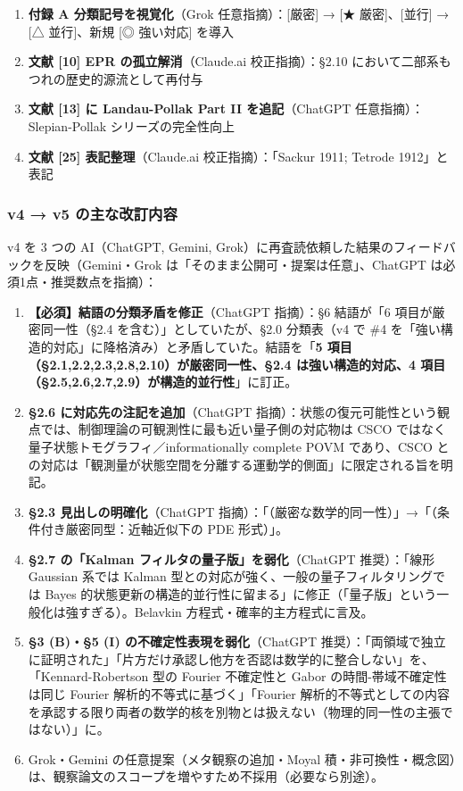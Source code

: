 \documentclass[
]{ltjsarticle}
\providecommand{\tightlist}{%
  \setlength{\itemsep}{0pt}\setlength{\parskip}{0pt}}
\begin{document}
\begin{enumerate}
  に「非ユニタリ Jones 行列は対応外」、\#9 に「量子側 Lindblad
  形式」など
\item
  \textbf{付録 A 分類記号を視覚化}（Grok 任意指摘）：{[}厳密{]} → {[}★
  厳密{]}、{[}並行{]} → {[}△ 並行{]}、新規 {[}◎ 強い対応{]} を導入
\item
  \textbf{文献 {[}10{]} EPR の孤立解消}（Claude.ai 校正指摘）：§2.10
  において二部系もつれの歴史的源流として再付与
\item
  \textbf{文献 {[}13{]} に Landau-Pollak Part II を追記}（ChatGPT
  任意指摘）：Slepian-Pollak シリーズの完全性向上
\item
  \textbf{文献 {[}25{]} 表記整理}（Claude.ai 校正指摘）：「Sackur 1911;
  Tetrode 1912」と表記
\end{enumerate}

\subsubsection{v4 → v5
の主な改訂内容}\label{v4-v5-ux306eux4e3bux306aux6539ux8a02ux5185ux5bb9}

v4 を 3 つの AI（ChatGPT, Gemini,
Grok）に再査読依頼した結果のフィードバックを反映（Gemini・Grok
は「そのまま公開可・提案は任意」、ChatGPT は必須1点・推奨数点を指摘）：

\begin{enumerate}
\def\labelenumi{\arabic{enumi}.}
\tightlist
\item
  \textbf{【必須】結語の分類矛盾を修正}（ChatGPT 指摘）：§6 結語が「6
  項目が厳密同一性（§2.4 を含む）」としていたが、§2.0 分類表（v4 で \#4
  を「強い構造的対応」に降格済み）と矛盾していた。結語を「\textbf{5
  項目（§2.1,2.2,2.3,2.8,2.10）が厳密同一性、§2.4 は強い構造的対応、4
  項目（§2.5,2.6,2.7,2.9）が構造的並行性}」に訂正。
\item
  \textbf{§2.6 に対応先の注記を追加}（ChatGPT
  指摘）：状態の復元可能性という観点では、制御理論の可観測性に最も近い量子側の対応物は
  CSCO ではなく量子状態トモグラフィ／informationally complete POVM
  であり、CSCO
  との対応は「観測量が状態空間を分離する運動学的側面」に限定される旨を明記。
\item
  \textbf{§2.3 見出しの明確化}（ChatGPT
  指摘）：「（厳密な数学的同一性）」→「（条件付き厳密同型：近軸近似下の
  PDE 形式）」。
\item
  \textbf{§2.7 の「Kalman フィルタの量子版」を弱化}（ChatGPT
  推奨）：「線形 Gaussian 系では Kalman
  型との対応が強く、一般の量子フィルタリングでは Bayes
  的状態更新の構造的並行性に留まる」に修正（「量子版」という一般化は強すぎる）。Belavkin
  方程式・確率的主方程式に言及。
\item
  \textbf{§3 (B)・§5 (I) の不確定性表現を弱化}（ChatGPT
  推奨）：「両領域で独立に証明された」「片方だけ承認し他方を否認は数学的に整合しない」を、「Kennard-Robertson
  型の Fourier 不確定性と Gabor の時間-帯域不確定性は同じ Fourier
  解析的不等式に基づく」「Fourier
  解析的不等式としての内容を承認する限り両者の数学的核を別物とは扱えない（物理的同一性の主張ではない）」に。
\item
  Grok・Gemini の任意提案（メタ観察の追加・Moyal
  積・非可換性・概念図）は、観察論文のスコープを増やすため不採用（必要なら別途）。
\end{enumerate}
\end{document}
